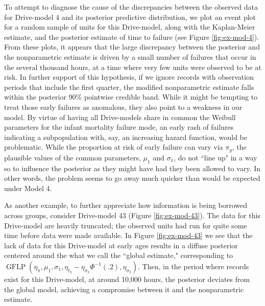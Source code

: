 \documentclass[12pt]{article}
\newcommand{\op}{\operatorname}
\begin{document}
To attempt to diagnose the cause of the discrepancies between the observed data for Drive-model 4 and its posterior predictive distribution, we plot an event plot for a random sample of units for this Drive-model, along with the Kaplan-Meier estimate, and the posterior estimate of time to failure (see Figure \ref{fig:ex-mod-4}). From these plots, it appears that the large discrepancy between the posterior and the nonparametric estimate is driven by a small number of failures that occur in the several thousand hours, at a time where very few units were observed to be at risk. In further support of this hypothesis, if we ignore records with observation periods that include the first quarter, the modified nonparametric estimate falls within the posterior 90\% pointwise credible band. While it might be tempting to treat those early failures as anomalous, they also point to a weakness in our model. By virtue of having all Drive-models share in common the Weibull parameters for the infant mortality failure mode, an early rash of failures indicating a subpopulation with, say, an increasing hazard function,  would be problematic. While the proportion at risk of early failure can vary via $\pi_g$, the plausible values of the common parameters, $\mu_1$ and $\sigma_1$, do not ``line up" in a way so to influence the posterior as they might have had they been allowed to vary. In other words, the problem seems to go away much quicker than would be expected under Model 4.

As another example, to further appreciate how information is being borrowed across groups, consider Drive-model 43 (Figure \ref{fig:ex-mod-43}). The data for this Drive-model are heavily truncated; the observed units had run for quite some time before data were made available. In Figure \ref{fig:ex-mod-43} we see that the lack of data for this Drive-model at early ages results in a diffuse posterior centered around the what we call the ``global estimate," corresponding to $\op{GFLP}(\eta_{\pi}, \mu_1,\sigma_1, \eta_{t_2} - \eta_{\sigma_2}\Phi^{-1}(.2), \eta_{\sigma_2})$. Then, in the period where records exist for this Drive-model, at around 10,000 hours, the posterior deviates from the global model, achieving a compromise between it and the nonparametric estimate.
\end{document}
